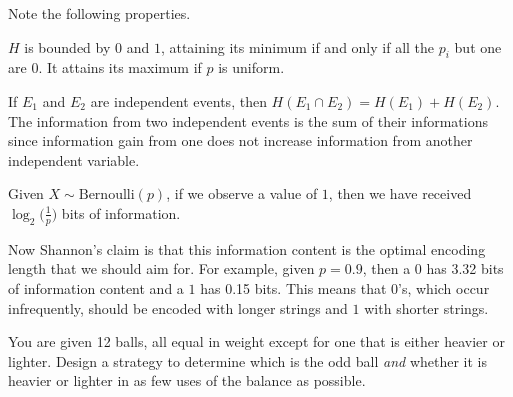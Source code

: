 \documentclass{article}
\begin{document}
    Note the following properties. 

    \begin{theorem}
      $H$ is bounded by $0$ and $1$, attaining its minimum if and only if all the $p_i$ but one are $0$. It attains its maximum if $p$ is uniform. 
    \end{theorem}

    \begin{theorem}
      If $E_1$ and $E_2$ are independent events, then $H(E_1 \cap E_2) = H(E_1) + H(E_2)$. The information from two independent events is the sum of their informations since information gain from one does not increase information from another independent variable.  
    \end{theorem}

    \begin{example}[Bits]
      Given $X \sim \mathrm{Bernoulli}(p)$, if we observe a value of $1$, then we have received $\log_2 \big( \frac{1}{p} \big)$ bits of information. 
    \end{example}

    Now Shannon's claim is that this information content is the optimal encoding length that we should aim for. For example, given $p = 0.9$, then a $0$ has 3.32 bits of information content and a $1$ has 0.15 bits. This means that $0$'s, which occur infrequently, should be encoded with longer strings and $1$ with shorter strings.   

    \begin{exercise}
      You are given 12 balls, all equal in weight except for one that is either heavier or lighter. Design a strategy to determine which is the odd ball \textit{and} whether it is heavier or lighter in as few uses of the balance as possible. 
    \end{exercise}
\end{document}
